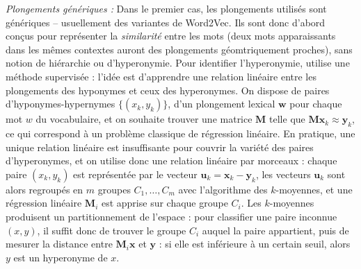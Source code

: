 \textit{Plongements génériques :}
Dans le premier cas, les plongements utilisés sont génériques – usuellement des variantes de Word2Vec. Ils sont donc d'abord conçus pour représenter la \textit{similarité} entre les mots (deux mots apparaissants dans les mêmes contextes auront des plongements géomtriquement proches), sans notion de hiérarchie ou d'hyperonymie. Pour identifier l'hyperonymie, \cite{fu2014learning} utilise une méthode supervisée : l'idée est d'apprendre une relation linéaire entre les plongements des hyponymes et ceux des hyperonymes. On dispose de paires d'hyponymes-hypernymes $\{(x_k, y_k )\}$, d'un plongement lexical $\textbf{w}$ pour chaque mot $w$ du vocabulaire, et on souhaite trouver une matrice $\textbf{M}$ telle que $\textbf{M} \textbf{x}_k \approx \textbf{y}_k$, ce qui correspond à un problème classique de régression linéaire. En pratique, une unique relation linéaire est insuffisante pour couvrir la variété des paires d'hyperonymes, et on utilise donc une relation linéaire par morceaux : chaque paire $(x_k, y_k)$ est représentée par le vecteur $\textbf{u}_k = \textbf{x}_k - \textbf{y}_k$, les vecteurs $\textbf{u}_k$ sont alors regroupés en $m$ groupes $C_1, \ldots, C_m$ avec l'algorithme des $k$-moyennes, et une régression linéaire $\textbf{M}_i$ est apprise sur chaque groupe $C_i$. Les $k$-moyennes produisent un partitionnement de l'espace : pour classifier une paire inconnue $(x, y)$, il suffit donc de trouver le groupe $C_i$ auquel la paire appartient, puis de mesurer la distance entre $\textbf{M}_i \textbf{x}$ et $\textbf{y}$ : si elle est inférieure à un certain seuil, alors $y$ est un hyperonyme de $x$.


